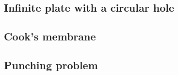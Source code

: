\subsection{Infinite plate with a circular hole}

\subsection{Cook’s membrane}

\subsection{Punching problem}









